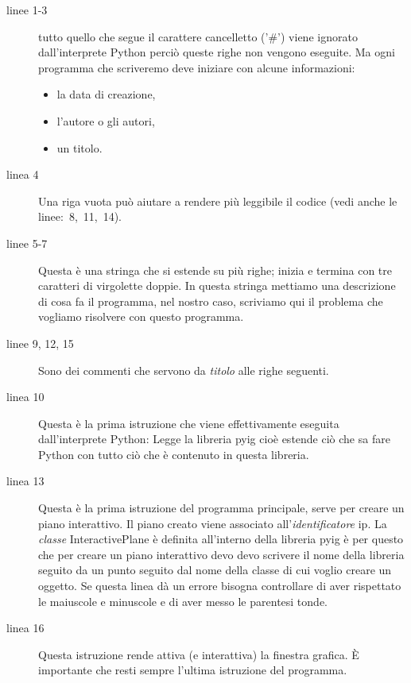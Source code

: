 \begin{description}
 \item [linee 1-3] 
 tutto quello che segue il carattere cancelletto ('\#') viene ignorato 
dall'interprete Python perciò queste righe non vengono eseguite. Ma ogni 
programma che scriveremo deve iniziare con alcune informazioni:
\begin{itemize} [nosep]
 \item la data di creazione, 
 \item l'autore o gli autori,
 \item un titolo.
\end{itemize}
 \item [linea 4]
 Una riga vuota può aiutare a rendere più leggibile il codice (vedi anche le 
linee:~8,~11,~14).
 \item [linee 5-7]
 Questa è una stringa che si estende su più righe; inizia e termina con tre 
caratteri di virgolette doppie. In questa stringa mettiamo una descrizione di 
cosa fa il programma, nel nostro caso, scriviamo qui il problema che vogliamo 
risolvere con questo programma.
 \item [linee 9, 12, 15]
 Sono dei commenti che servono da \emph{titolo} alle righe seguenti.
 \item [linea 10]
 Questa è la prima istruzione che viene effettivamente eseguita 
dall'interprete Python: Legge la libreria {\ttfamily pyig} cioè estende ciò 
che sa fare Python con tutto ciò che è contenuto in questa libreria. 
 \item [linea 13]
 Questa è la prima istruzione del programma principale, serve per creare un 
piano interattivo. Il piano creato viene associato all'\emph{identificatore}
{\ttfamily ip}. La \emph{classe} {\ttfamily InteractivePlane} è definita 
all'interno della libreria {\ttfamily pyig} è per questo che per creare un 
piano interattivo devo devo scrivere il nome della libreria seguito da un punto 
seguito dal nome della classe di cui voglio creare un oggetto. Se 
questa linea dà un errore bisogna controllare di aver rispettato le maiuscole e 
minuscole e di aver messo le parentesi tonde. 
 \item [linea 16]
 Questa istruzione rende attiva (e interattiva) la finestra grafica. È 
importante che resti sempre l'ultima istruzione del programma.
\end{description}

